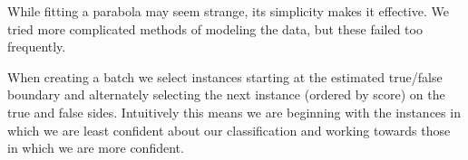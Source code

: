 \documentclass[ms,electronic,twosidetoc,letterpaper,chaptercenter,parttop,lof,lot]{byumsphd}
\begin{document}
While fitting a parabola may seem strange, its simplicity makes it effective. We tried more complicated methods of modeling the data, but these failed too frequently.

When creating a batch we select instances starting at the estimated true/false boundary and alternately selecting the next instance (ordered by score) on the true and false sides. Intuitively this means we are beginning with the instances in which we are least confident about our classification and working towards those in which we are more confident.


\end{document}
